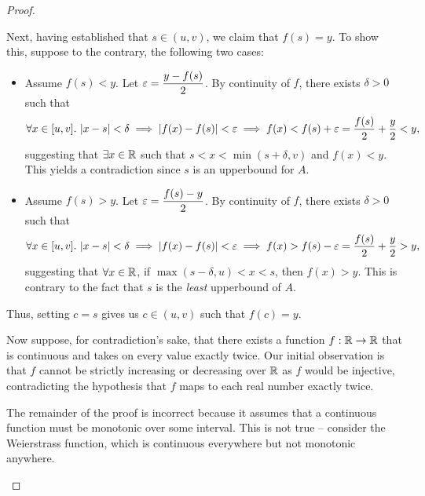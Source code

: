 \begin{problem}
\begin{proof}
\begin{subproof}
      Next, having established that $s \in (u, v)$, we claim that $f(s) = y$.
      To show this, suppose to the contrary, the following two cases:
      \begin{itemize}
        \item Assume $f(s) < y$. Let $\varepsilon = \dfrac{y - f(s)}{2}$. By continuity of $f$, there exists $\delta > 0$ 
          such that
          \[
            \forall x \in [u,v].\, \left\lvert x - s \right\rvert < \delta \implies \left\lvert f(x) - f(s) \right\rvert < \varepsilon \implies f(x) < f(s) + \varepsilon = \frac{f(s)}{2} + \frac{y}{2} < y,
          \]
          suggesting that $\exists x \in \mathbb{R}$ such that $s < x < \min{(s + \delta, v)}$ and $f(x) < y$.
          This yields a contradiction since $s$ is an upperbound for $A$.

        \item Assume $f(s) > y$. Let $\varepsilon = \dfrac{f(s) - y}{2}$. By continuity of $f$, there exists $\delta > 0$ 
          such that
          \[
            \forall x \in [u,v].\, \left\lvert x - s \right\rvert < \delta \implies \left\lvert f(x) - f(s) \right\rvert < \varepsilon \implies f(x) > f(s) - \varepsilon = \frac{f(s)}{2} + \frac{y}{2} > y,
          \]
          suggesting that $\forall x \in \mathbb{R}$, if $\max{(s - \delta, u)} < x < s$, then $f(x) > y$. This is contrary to the fact that
          $s$ is the \textit{least} upperbound of $A$.

      \end{itemize}

      Thus, setting $c = s$ gives us $c \in (u, v)$ such that $f(c) = y$.
    \end{subproof}

    Now suppose, for contradiction's sake, that there exists a function $f : \mathbb{R} \to \mathbb{R}$
    that is continuous and takes on every value exactly twice. Our initial
    observation is that $f$ cannot be strictly increasing or decreasing over 
    $\mathbb{R}$ as $f$ would be injective, contradicting the hypothesis that $f$ maps 
    to each real number exactly twice. 

    \begin{callout}
      The remainder of the proof is incorrect because it assumes that a continuous function
      must be monotonic over some interval. This is not true -- consider the
      Weierstrass function, which is continuous everywhere but not monotonic
      anywhere.
    \end{callout}


\end{proof}
\end{problem}
